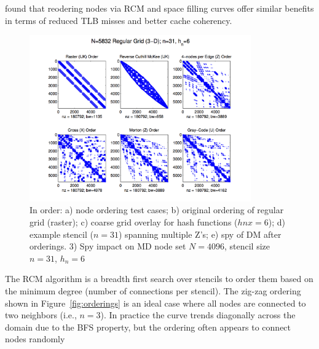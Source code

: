 \documentclass{report}
\begin{document}
\cite{MellorCrummey2001} found that reodering nodes via RCM and space filling curves offer similar benefits in terms of reduced TLB misses and better cache coherency. 





\begin{figure}
\centering
\includegraphics[width=0.85\textwidth]{rbffd_methods_content/hashing/spy_regulargrid_N18d3_n31_hn6.png} 
\caption{In order: a) node ordering test cases; b) original ordering of regular grid (raster); c) coarse grid overlay for hash functions ($hnx = 6$); d) example stencil ($n=31$) spanning multiple Z's; e) spy of DM after orderings.  3) Spy impact on MD node set $N=4096$, stencil size $n=31$, $h_n = 6$ }
\label{fig:ordering_impact_rg}
\end{figure}


The RCM algorithm is a breadth first search over stencils to order them based on the minimum degree (number of connections per stencil). The zig-zag ordering shown in Figure~\ref{fig:orderings} is an ideal case where all nodes are connected to two neighbors (i.e., $n=3$). In practice the curve trends diagonally across the domain due to the BFS property, but the ordering often appears to connect nodes randomly 
\end{document}
